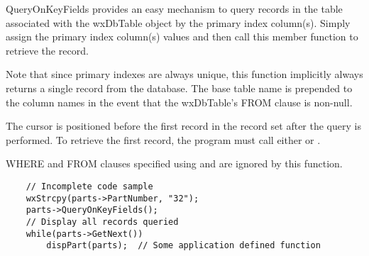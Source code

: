 \label{wxdbtablequeryonkeyfields}


QueryOnKeyFields provides an easy mechanism to query records in the table
associated with the wxDbTable object by the primary index column(s).  Simply
assign the primary index column(s) values and then call this member function
to retrieve the record.

Note that since primary indexes are always unique, this function implicitly
always returns a single record from the database. The base table name is
prepended to the column names in the event that the wxDbTable's FROM clause
is non-null.




The cursor is positioned before the first record in the record set after
the query is performed.  To retrieve the first record, the program must call
either  or
.

WHERE and FROM clauses specified using 
and  are ignored by
this function.


\begin{verbatim}
    // Incomplete code sample
    wxStrcpy(parts->PartNumber, "32");
    parts->QueryOnKeyFields();
    // Display all records queried
    while(parts->GetNext())
        dispPart(parts);  // Some application defined function
\end{verbatim}

\label{wxdbtablerefresh}

